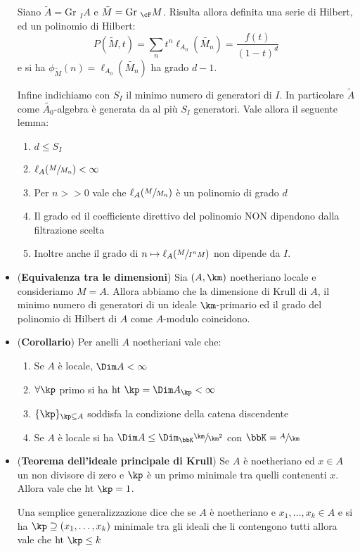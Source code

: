 \documentclass[a4paper,NoNotes,GeneralMath]{stdmdoc}
\newcommand{\cl}{\ell}
\newcommand{\Ht}{\text{ht }}
\newcommand{\Gr}{\text{Gr }}
\begin{document}
\begin{itemize}
  Siano $\tilde{A} = \Gr_I A$ e $\tilde{M} = \Gr_\cF M$. Risulta allora
  definita una serie di Hilbert, ed un polinomio di Hilbert:
  $$ P(\tilde{M}, t) = \sum_n t^n \cl_{A_0} (\tilde{M_n}) =
  \frac{f(t)}{(1-t)^d} $$ e si ha $\phi_{\tilde{M}} (n) = \cl_{A_0}
  (\tilde{M_n})$ ha grado $d - 1$.

  Infine indichiamo con $S_I$ il minimo numero di generatori di $I$. In
  particolare $\tilde{A}$ come $\tilde{A_0}$-algebra è generata da al
  più $S_I$ generatori. Vale allora il seguente lemma:
  \begin{enumerate}
  \item $d \le S_I$
  \item $\cl_A (\sfrac{M}{M_n}) < \infty$
  \item Per $n >> 0$ vale che $\cl_A (\sfrac{M}{M_n})$ è un polinomio di
    grado $d$
  \item Il grado ed il coefficiente direttivo del polinomio NON
    dipendono dalla filtrazione scelta
  \item Inoltre anche il grado di $n \mapsto \cl_A (\sfrac{M}{I^n M})$
    non dipende da $I$.
  \end{enumerate}
\item ({\bf Equivalenza tra le dimensioni}) Sia $(A, \km)$ noetheriano
  locale e consideriamo $M = A$. Allora abbiamo che la dimensione di
  Krull di $A$, il minimo numero di generatori di un ideale
  $\km$-primario ed il grado del polinomio di Hilbert di $A$ come
  $A$-modulo coincidono.
\item ({\bf Corollario}) Per anelli $A$ noetheriani vale che:
  \begin{enumerate}
  \item Se $A$ è locale, $\Dim A < \infty$
  \item $\forall \kp$ primo si ha $\Ht \kp = \Dim A_\kp < \infty$
  \item $\{\kp\}_{\kp \subseteq A}$ soddisfa la condizione della catena
    discendente
  \item Se $A$ è locale si ha $\Dim A \le \Dim_\bbK \sfrac{\km}{\km^2}$
    con $\bbK = \sfrac{A}{\km}$
  \end{enumerate}
\item ({\bf Teorema dell'ideale principale di Krull}) Se $A$ è
  noetheriano ed $x \in A$ un non divisore di zero e $\kp$ è un primo
  minimale tra quelli contenenti $x$. Allora vale che $\Ht \kp = 1$.

  Una semplice generalizzazione dice che se $A$ è noetheriano e $x_1,
  \ldots, x_k \in A$ e si ha $\kp \supseteq (x_1, \ldots, x_k)$ minimale
  tra gli ideali che li contengono tutti allora vale che $\Ht \kp \le k$


\end{itemize}
\end{document}
